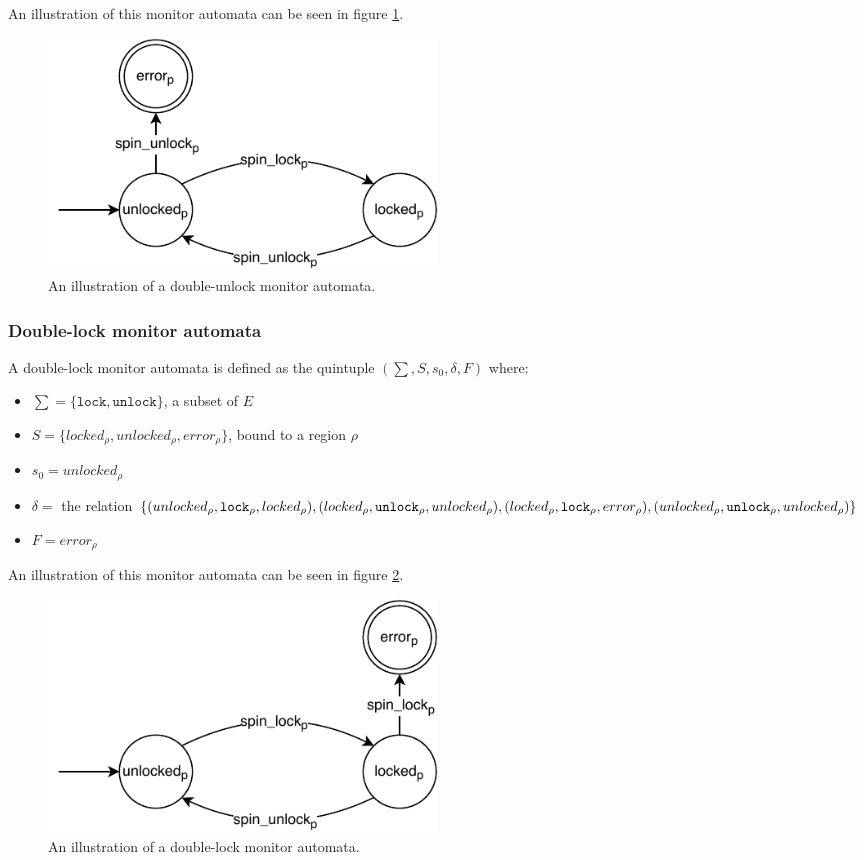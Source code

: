 An illustration of this monitor automata can be seen in figure \ref{double-unlock-automata}. 

\begin{figure}[H]
    \centering
    \includegraphics[width=0.5\textwidth]{background/figures/double-unlock}
    \caption{An illustration of a double-unlock monitor automata.}
    \label{double-unlock-automata}
\end{figure}
    
\subsubsection{Double-lock monitor automata}

A double-lock monitor automata is defined as the quintuple $(\sum, S, s_0, \delta, F)$ where: 

\begin{itemize}
    \item $\sum = \{\texttt{lock}, \texttt{unlock}\}$, a subset of $E$
    \item $S = \{ locked_\rho, unlocked_\rho, error_\rho \}$, bound to a region $\rho$
    \item $s_0 = unlocked_\rho$ 
    \item $\delta =$ the relation $\{(unlocked_\rho, \texttt{lock}_\rho, locked_\rho), (locked_\rho, \texttt{unlock}_\rho, unlocked_\rho), \\
    (locked_\rho, \texttt{lock}_\rho, error_\rho), (unlocked_\rho, \texttt{unlock}_\rho, unlocked_\rho)\}$ 
    \item $F = error_\rho$  
\end{itemize}

An illustration of this monitor automata can be seen in figure \ref{double-lock-automata}. 

\begin{figure}[H]
    \centering
    \includegraphics[width=0.5\textwidth]{background/figures/double-lock}
    \caption{An illustration of a double-lock monitor automata.}
    \label{double-lock-automata}
\end{figure}

